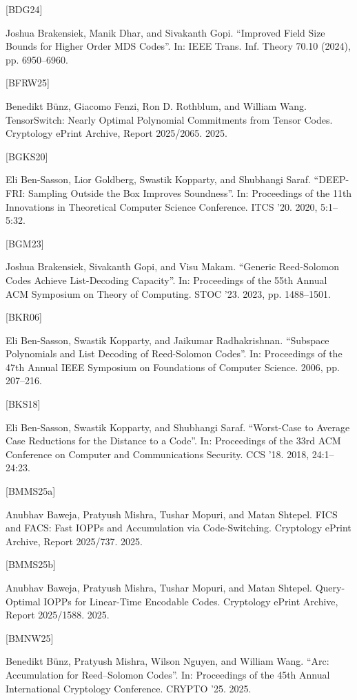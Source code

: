 \documentclass[11pt]{article}
\begin{document}
[BDG24]

Joshua Brakensiek, Manik Dhar, and Sivakanth Gopi. “Improved Field Size Bounds for
Higher Order MDS Codes”. In: IEEE Trans. Inf. Theory 70.10 (2024), pp. 6950–6960.

[BFRW25]

Benedikt Bünz, Giacomo Fenzi, Ron D. Rothblum, and William Wang. TensorSwitch: Nearly
Optimal Polynomial Commitments from Tensor Codes. Cryptology ePrint Archive, Report
2025/2065. 2025.

[BGKS20]

Eli Ben-Sasson, Lior Goldberg, Swastik Kopparty, and Shubhangi Saraf. “DEEP-FRI: Sampling Outside the Box Improves Soundness”. In: Proceedings of the 11th Innovations in
Theoretical Computer Science Conference. ITCS ’20. 2020, 5:1–5:32.

[BGM23]

Joshua Brakensiek, Sivakanth Gopi, and Visu Makam. “Generic Reed-Solomon Codes Achieve
List-Decoding Capacity”. In: Proceedings of the 55th Annual ACM Symposium on Theory
of Computing. STOC ’23. 2023, pp. 1488–1501.

[BKR06]

Eli Ben-Sasson, Swastik Kopparty, and Jaikumar Radhakrishnan. “Subspace Polynomials
and List Decoding of Reed-Solomon Codes”. In: Proceedings of the 47th Annual IEEE Symposium on Foundations of Computer Science. 2006, pp. 207–216.

[BKS18]

Eli Ben-Sasson, Swastik Kopparty, and Shubhangi Saraf. “Worst-Case to Average Case
Reductions for the Distance to a Code”. In: Proceedings of the 33rd ACM Conference on
Computer and Communications Security. CCS ’18. 2018, 24:1–24:23.

[BMMS25a]

Anubhav Baweja, Pratyush Mishra, Tushar Mopuri, and Matan Shtepel. FICS and FACS:
Fast IOPPs and Accumulation via Code-Switching. Cryptology ePrint Archive, Report
2025/737. 2025.

[BMMS25b]

Anubhav Baweja, Pratyush Mishra, Tushar Mopuri, and Matan Shtepel. Query-Optimal
IOPPs for Linear-Time Encodable Codes. Cryptology ePrint Archive, Report 2025/1588.
2025.

[BMNW25]

Benedikt Bünz, Pratyush Mishra, Wilson Nguyen, and William Wang. “Arc: Accumulation
for Reed–Solomon Codes”. In: Proceedings of the 45th Annual International Cryptology
Conference. CRYPTO ’25. 2025.
\end{document}
